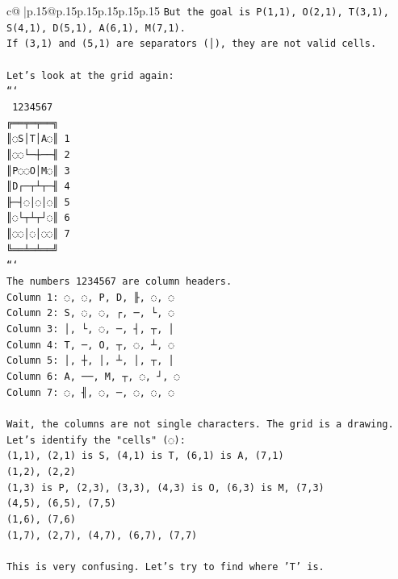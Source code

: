 \documentclass{article}
\begin{document}
{\begin{supertabular}{c@{$\;$}|p{.15\linewidth}@{}p{.15\linewidth}p{.15\linewidth}p{.15\linewidth}p{.15\linewidth}p{.15\linewidth}}
{{{\texttt{But the goal is P(1,1), O(2,1), T(3,1), S(4,1), D(5,1), A(6,1), M(7,1).} \\
\texttt{If (3,1) and (5,1) are separators (│), they are not valid cells.} \\
\\ 
\texttt{Let's look at the grid again:} \\
\texttt{```} \\
\texttt{ 1234567} \\
\texttt{╔══╤═╤══╗} \\
\texttt{║◌S│T│A◌║ 1} \\
\texttt{║◌◌└─┼──╢ 2} \\
\texttt{║P◌◌O│M◌║ 3} \\
\texttt{║D┌─┬┴┬─╢ 4} \\
\texttt{╟─┤◌│◌│◌║ 5} \\
\texttt{║◌└┬┴┬┘◌║ 6} \\
\texttt{║◌◌│◌│◌◌║ 7} \\
\texttt{╚══╧═╧══╝} \\
\texttt{```} \\
\texttt{The numbers 1234567 are column headers.} \\
\texttt{Column 1: ◌, ◌, P, D, ╟, ◌, ◌} \\
\texttt{Column 2: S, ◌, ◌, ┌, ─, └, ◌} \\
\texttt{Column 3: │, └, ◌, ─, ┤, ┬, │} \\
\texttt{Column 4: T, ─, O, ┬, ◌, ┴, ◌} \\
\texttt{Column 5: │, ┼, │, ┴, │, ┬, │} \\
\texttt{Column 6: A, ──, M, ┬, ◌, ┘, ◌} \\
\texttt{Column 7: ◌, ╢, ◌, ─, ◌, ◌, ◌} \\
\\ 
\texttt{Wait, the columns are not single characters. The grid is a drawing.} \\
\texttt{Let's identify the "cells" (◌):} \\
\texttt{(1,1), (2,1) is S, (4,1) is T, (6,1) is A, (7,1)} \\
\texttt{(1,2), (2,2)} \\
\texttt{(1,3) is P, (2,3), (3,3), (4,3) is O, (6,3) is M, (7,3)} \\
\texttt{(4,5), (6,5), (7,5)} \\
\texttt{(1,6), (7,6)} \\
\texttt{(1,7), (2,7), (4,7), (6,7), (7,7)} \\
\\ 
\texttt{This is very confusing. Let's try to find where 'T' is.} \\
}}}
\end{supertabular}}
\end{document}
